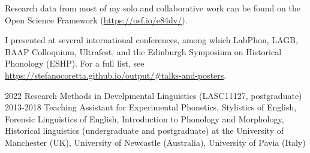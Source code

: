 \documentclass[9pt]{developercv} %
\begin{document}


\begin{entrylist}
	\entry
		{\hspace{1em}}
		{\textnormal{Research data from most of my solo and collaborative work can be found on the Open Science Framework (\url{https://osf.io/e84dv/}).}}
		{}
		{}
\end{entrylist}



\begin{entrylist}
	\entry
		{\hspace{1em}}
		{\textnormal{I presented at several international conferences, among which LabPhon, LAGB, BAAP Colloquium, Ultrafest, and the Edinburgh Symposium on Historical Phonology (ESHP). For a full list, see \url{https://stefanocoretta.github.io/output/\#talks-and-posters}.}}
		{}
		{}
\end{entrylist}



\begin{entrylist}
	\entry
		{2022}
		{Research Methods in Develpmental Linguistics \textnormal{(LASC11127, postgraduate)}}
		{}
		{}
	\entry
	  {2013-2018}
	  {\textnormal{Teaching Assistant for} Experimental Phonetics, Stylistics of English, Forensic Linguistics of English, Introduction to Phonology and Morphology, Historical linguistics \textnormal{(undergraduate and postgraduate) at the University of Manchester (UK), University of Newcastle (Australia), University of Pavia (Italy)}}
	  {}
	  {}
\end{entrylist}


\begin{entrylist}
\end{entrylist}
\end{document}
